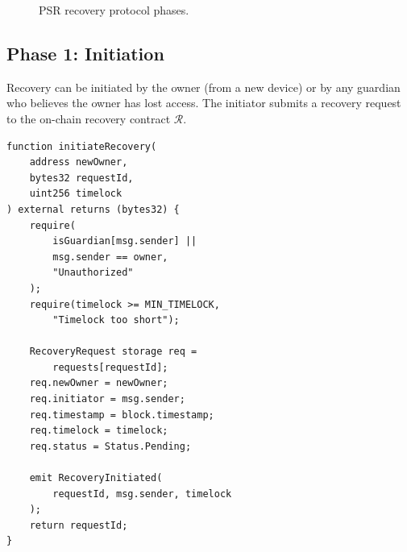 \documentclass[11pt,a4paper,twocolumn]{article}
\begin{document}
\begin{figure}[H]
\centering
{}
\caption{PSR recovery protocol phases.}
\label{fig:protocol}
\end{figure}

\subsection{Phase 1: Initiation}

Recovery can be initiated by the owner (from a new device) or by any guardian who believes the owner has lost access. The initiator submits a recovery request to the on-chain recovery contract $\mathcal{R}$.

\begin{lstlisting}[style=solidity,caption={Recovery initiation},label={lst:initiate}]
function initiateRecovery(
    address newOwner,
    bytes32 requestId,
    uint256 timelock
) external returns (bytes32) {
    require(
        isGuardian[msg.sender] ||
        msg.sender == owner,
        "Unauthorized"
    );
    require(timelock >= MIN_TIMELOCK,
        "Timelock too short");

    RecoveryRequest storage req =
        requests[requestId];
    req.newOwner = newOwner;
    req.initiator = msg.sender;
    req.timestamp = block.timestamp;
    req.timelock = timelock;
    req.status = Status.Pending;

    emit RecoveryInitiated(
        requestId, msg.sender, timelock
    );
    return requestId;
}
\end{lstlisting}
\end{document}
